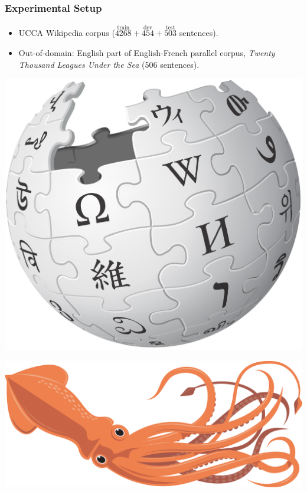 \documentclass[t,xcolor={svgnames}]{beamer}
\begin{document}
\begin{frame}
\frametitle{Experimental Setup}
\begin{itemize}
 \item UCCA Wikipedia corpus ($\stackrel{\text{train}}{4268}+\stackrel{\text{dev}}{454}+\stackrel{\text{test}}{503}$ sentences).
 \item Out-of-domain: English part of English-French parallel corpus,
 	\textit{Twenty Thousand Leagues Under the Sea} (506 sentences).
\end{itemize}

\vfill
\begin{center}
  \begin{minipage}{.3\textwidth}\includegraphics[width=\textwidth]{wikipedia.png}\end{minipage}
  \begin{minipage}{.3\textwidth}\includegraphics[width=\textwidth]{squid.jpg}\end{minipage}
\end{center}
\end{frame}
\end{document}
